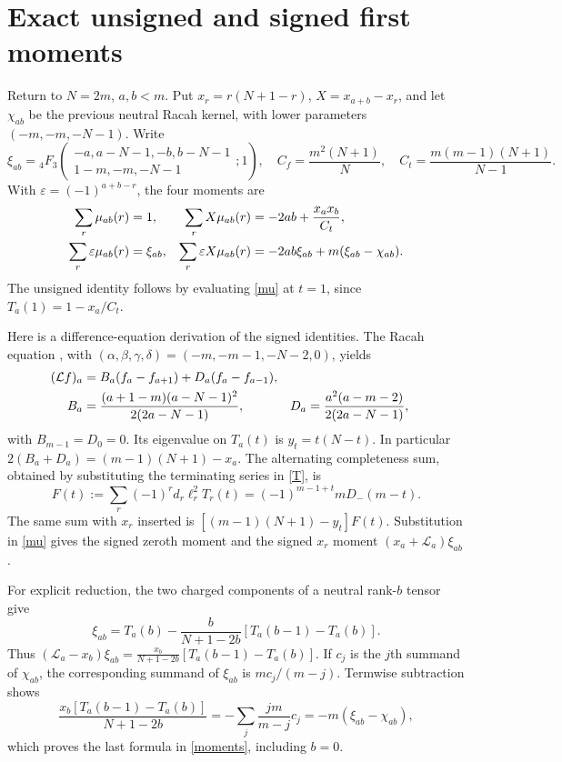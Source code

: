 \documentclass[11pt,a4paper]{article}
\begin{document}
\newpage
\section{Exact unsigned and signed first moments}
Return to $N=2m$, $a,b<m$. Put $x_r=r(N+1-r)$,
$X=x_{a+b}-x_r$, and let $\chi_{ab}$ be the previous neutral
Racah kernel, with lower parameters $(-m,-m,-N-1)$.
Write
\begin{equation}
 \xi_{ab}={}_4F_3\!\left(\begin{matrix}-a,a-N-1,-b,b-N-1\\
 1-m,-m,-N-1\end{matrix};1\right),\quad
 C_f=\frac{m^2(N+1)}N,\quad
 C_t=\frac{m(m-1)(N+1)}{N-1}.
\end{equation}
With $\varepsilon=(-1)^{a+b-r}$, the four moments are
\begin{align}
 \sum_r\mu_{ab}(r)&=1,&
 \sum_rX\mu_{ab}(r)&=-2ab+\frac{x_ax_b}{C_t},\notag\\
 \sum_r\varepsilon\mu_{ab}(r)&=\xi_{ab},&
 \sum_r\varepsilon X\mu_{ab}(r)
 &=-2ab\xi_{ab}+m(\xi_{ab}-\chi_{ab}).\label{moments}
\end{align}
The unsigned identity follows by evaluating \eqref{mu} at $t=1$,
since $T_a(1)=1-x_a/C_t$.

Here is a difference-equation derivation of the signed identities.
The Racah equation \cite{ks}, with
$(\alpha,\beta,\gamma,\delta)=(-m,-m-1,-N-2,0)$, yields
\begin{align}
 (\mathcal Lf)_a&=B_a(f_a-f_{a+1})+D_a(f_a-f_{a-1}),\notag\\
 B_a&=\frac{(a+1-m)(a-N-1)^2}{2(2a-N-1)},&
 D_a&=\frac{a^2(a-m-2)}{2(2a-N-1)},\label{rates}
\end{align}
with $B_{m-1}=D_0=0$. Its eigenvalue on $T_a(t)$ is $y_t=t(N-t)$.
In particular $2(B_a+D_a)=(m-1)(N+1)-x_a$.
The alternating completeness sum, obtained by substituting the
terminating series in \eqref{T}, is
\begin{equation}
 F(t):=\sum_r(-1)^rd_r\ell_r^2T_r(t)
   =(-1)^{m-1+t}mD_-(m-t).
\end{equation}
The same sum with $x_r$ inserted is
$[(m-1)(N+1)-y_t]F(t)$. Substitution in \eqref{mu} gives the
signed zeroth moment and the signed $x_r$ moment
$(x_a+\mathcal L_a)\xi_{ab}$.

For explicit reduction, the two charged components of a neutral
rank-$b$ tensor give
\begin{equation}
 \xi_{ab}=T_a(b)-\frac b{N+1-2b}[T_a(b-1)-T_a(b)].
\end{equation}
Thus $(\mathcal L_a-x_b)\xi_{ab}=
\frac{x_b}{N+1-2b}[T_a(b-1)-T_a(b)]$.
If $c_j$ is the $j$th summand of $\chi_{ab}$, the corresponding
summand of $\xi_{ab}$ is $mc_j/(m-j)$. Termwise subtraction shows
\begin{equation}
 \frac{x_b[T_a(b-1)-T_a(b)]}{N+1-2b}
 =-\sum_j\frac{jm}{m-j}c_j=-m(\xi_{ab}-\chi_{ab}),
\end{equation}
which proves the last formula in \eqref{moments}, including $b=0$.
\end{document}
